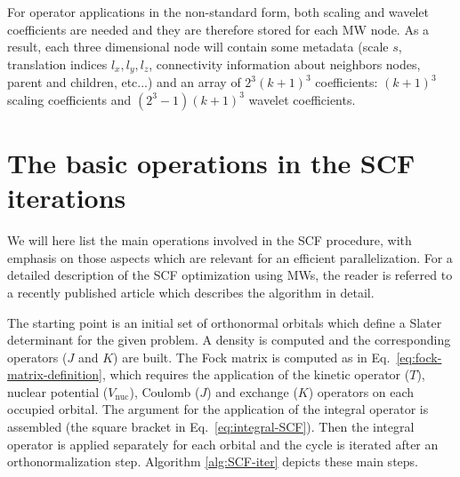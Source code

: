 \documentclass[journal=jctcce, manuscript=suppinfo]{achemso}
\begin{document}
For operator applications in the non-standard form\cite{Beylkin.10.1002/cpa.3160440202,Frediani.10.1080/00268976.2013.810793}, both scaling and wavelet coefficients are needed and they are therefore stored for each \ac{MW} node. As a result, each three dimensional node will contain some metadata (scale $s$, translation indices $l_x, l_y, l_z$, connectivity information about neighbors nodes, parent and children, etc...) and an array of $2^3 (k+1)^3$ coefficients: $(k+1)^3$ scaling coefficients and $(2^3-1)(k+1)^3$ wavelet coefficients.

\section{The basic operations in the SCF iterations}

We will here list the main operations involved in the \ac{SCF} procedure, with emphasis on those aspects which are relevant for an efficient parallelization. For a detailed description of the \ac{SCF} optimization using \acp{MW}, the reader is referred to a recently published article which describes the algorithm in detail.\cite{Jensen:2022gg}

The starting point is an initial set of orthonormal orbitals which define a Slater determinant for the given problem. A density is computed and the corresponding operators ($J$ and $K$) are built. The Fock matrix is computed as in Eq.~\eqref{eq:fock-matrix-definition}, which requires the application of the kinetic operator ($T$), nuclear potential ($V_{\mathrm{nuc}}$), Coulomb ($J$) and exchange ($K$) operators on each occupied orbital. The argument for the application of the integral operator is assembled (the square bracket in Eq.~\eqref{eq:integral-SCF}). Then the integral operator is applied separately for each orbital and the cycle is iterated after an orthonormalization step. Algorithm \ref{alg:SCF-iter} depicts these main steps.
\end{document}
